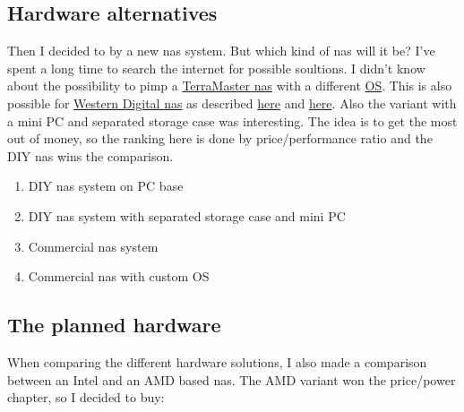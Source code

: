 \subsection{Hardware alternatives}

Then I decided to by a new \gls{nas} system. But which kind of \gls{nas} will
it be? I've spent a long time to search the internet for possible soultions.
I didn't know about the possibility to pimp a \href{https://www.terra-master.com}{TerraMaster \gls{nas}}
with a different \href{https://www.youtube.com/watch?v=f9Fh8XgREJ0}{OS}. This
is also possible for \href{https://www.westerndigital.com}{Western Digital \gls{nas}}
as described \href{https://community.wd.com/t/firmware-freenas-on-pr4100-updated/218730/11}{here}
and \href{https://forum.openmediavault.org/index.php?thread/37009-can-i-install-omv-on-a-wd-nas/}{here}.
Also the variant with a mini PC and separated storage case was interesting. The
idea is to get the most out of money, so the ranking here is done by
price/performance ratio and the DIY \gls{nas} wins the comparison.

\begin{enumerate}
    \item DIY \gls{nas} system on PC base
    \item DIY \gls{nas} system with separated storage case and mini PC
    \item Commercial \gls{nas} system
    \item Commercial \gls{nas} with custom OS
\end{enumerate}

\subsection{The planned hardware}

When comparing the different hardware solutions, I also made a comparison
between an Intel and an AMD based \gls{nas}. The AMD variant won the price/power
chapter, so I decided to buy:

